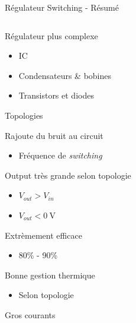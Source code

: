 \begin{frame}{Régulateur Switching - Résumé}
    \begin{columns}
        \begin{column}{0.6\textwidth}
            \vspace{-18pt}
            \begin{itemize}
                \item<1-> Régulateur plus complexe
                \begin{itemize}
                    \item<1-> IC
                    \item<1-> Condensateurs \& bobines
                    \item<1-> Transistors et diodes
                \end{itemize}
                \item<1-> Topologies
                \item<2-> Rajoute du bruit au circuit
                \begin{itemize}
                    \item<2-> Fréquence de \textit{switching}
                \end{itemize}
                \item<3-> Output très grande selon topologie
                \begin{itemize}
                    \item<3-> $V_{out} > V_{in}$
                    \item<3-> $V_{out} < \SI{0}{\volt}$
                \end{itemize}
                \item<4-> Extrèmement efficace
                \begin{itemize}
                    \item<4-> 80\% - 90\%
                \end{itemize}
                 {
                \item Bonne gestion thermique
                \begin{itemize}
                    \item Selon topologie
                \end{itemize}
                \item Gros courants
                }
            \end{itemize}
        \end{column}


\end{columns}
\end{frame}
